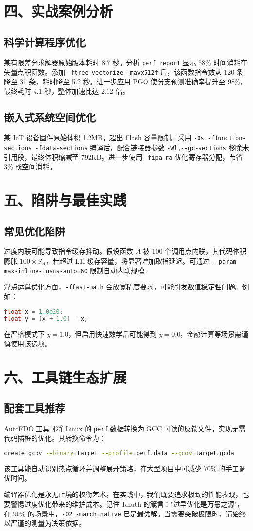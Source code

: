\chapter{四、实战案例分析}
\section{科学计算程序优化}
某有限差分求解器原始版本耗时 8.7 秒。分析 \verb!perf report! 显示 68\%{} 时间消耗在矢量点积函数。添加 \verb!-ftree-vectorize -mavx512f! 后，该函数指令数从 120 条降至 31 条，耗时降至 5.2 秒。进一步应用 PGO 使分支预测准确率提升至 98\%{}，最终耗时 4.1 秒，整体加速比达 2.12 倍。\par
\section{嵌入式系统空间优化}
某 IoT 设备固件原始体积 1.2MB，超出 Flash 容量限制。采用 \verb!-Os -ffunction-sections -fdata-sections! 编译后，配合链接器参数 \verb!-Wl,--gc-sections! 移除未引用段，最终体积缩减至 792KB。进一步使用 \verb!-fipa-ra! 优化寄存器分配，节省 3\%{} 栈空间消耗。\par
\chapter{五、陷阱与最佳实践}
\section{常见优化陷阱}
过度内联可能导致指令缓存抖动。假设函数 $A$ 被 100 个调用点内联，其代码体积膨胀 $100 \times S_A$，若超过 L1i 缓存容量，将显著增加取指延迟。可通过 \verb!--param max-inline-insns-auto=60! 限制自动内联规模。\par
浮点运算优化方面，\verb!-ffast-math! 会放宽精度要求，可能引发数值稳定性问题。例如：\par
\begin{lstlisting}[language=c]
float x = 1.0e20;
float y = (x + 1.0) - x;
\end{lstlisting}
在严格模式下 $y=1.0$，但启用快速数学后可能得到 $y=0.0$。金融计算等场景需谨慎使用该选项。\par
\chapter{六、工具链生态扩展}
\section{配套工具推荐}
AutoFDO 工具可将 Linux 的 \verb!perf! 数据转换为 GCC 可读的反馈文件，实现无需代码插桩的优化。其转换命令为：\par
\begin{lstlisting}[language=bash]
create_gcov --binary=target --profile=perf.data --gcov=target.gcda
\end{lstlisting}
该工具能自动识别热点循环并调整展开策略，在大型项目中可减少 70\%{} 的手工调优时间。\par
编译器优化是永无止境的权衡艺术。在实践中，我们既要追求极致的性能表现，也要警惕过度优化带来的维护成本。记住 Knuth 的箴言："过早优化是万恶之源"，在 90\%{} 的场景中，\verb!-O2 -march=native! 已是最优解。当需要突破极限时，请始终以严谨的测量为决策依据。\par
